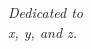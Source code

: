 \clearpage
\null\vfill
\begin{flushright}
	\textit{Dedicated to \\
		x, y, and z.}
\end{flushright}
\vfill
